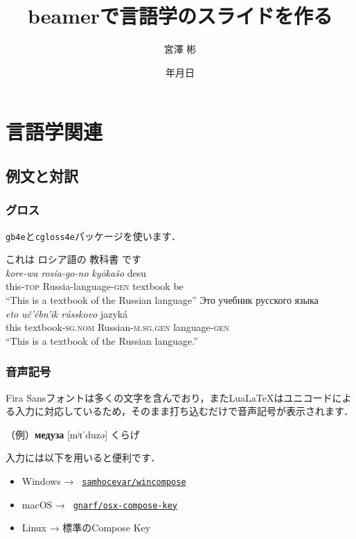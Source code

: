 \documentclass[12pt]{beamer}
\title{beamerで言語学のスライドを作る}
\institute{総合研究大学院大学}
\author{宮澤 彬}
\date{{\number\year}年{\number\month}月{\number\day}日}
\begin{document}
\begin{frame}
    \nocite{demo}
    \maketitle
\end{frame}

\section{言語学関連}
\subsection{例文と対訳}
\begin{frame}
\setlength{\glossglue}{5pt plus 2pt minus 1pt}\footnotesize
\frametitle{グロス}
\texttt{gb4e}と\texttt{cgloss4e}パッケージを使います．

\begin{exe}
    \ex%
    \glll%
    {これは} {ロシア語の} {教科書} {です} \\
    {\textit{kore-wa}} {\textit{rosia-go-no}} {\textit{kyōkašo}} {desu} \\
    {this-\textsc{top}} {Russia-language-\textsc{gen}} {textbook} {be} \\
    \trans%
    ``This is a textbook of the Russian language''
    \ex%
    \glll%
    {Это} {учебник} {русского} {языка} \\
    {\textit{eto}} {\textit{uč'ébn'ik}} {\textit{rússkovo}} {jazyká} \\
    {this} {textbook-\textsc{sg.nom}} {Russian-\textsc{m.sg.gen}} {language-\textsc{gen}} \\
    \trans%
    ``This is a textbook of the Russian language.''
\end{exe}
\end{frame}

\begin{frame}
    \frametitle{音声記号}
    Fira Sansフォントは多くの文字を含んでおり，またLua\LaTeX はユニコードによる入力に対応しているため，そのまま打ち込むだけで音声記号が表示されます．

    \smallskip

    （例）\textbf{медуза} [mʲɪˈduzə] くらげ

    \bigskip

    入力には以下を用いると便利です．
    \begin{itemize}
        \item Windows → \faGithub\ \href{https://github.com/samhocevar/wincompose}{\texttt{samhocevar/wincompose}}
        \item macOS → \faGithub\ \href{https://github.com/gnarf/osx-compose-key}{\texttt{gnarf/osx-compose-key}}
        \item Linux → 標準のCompose Key
    \end{itemize}
\end{frame}
\end{document}
